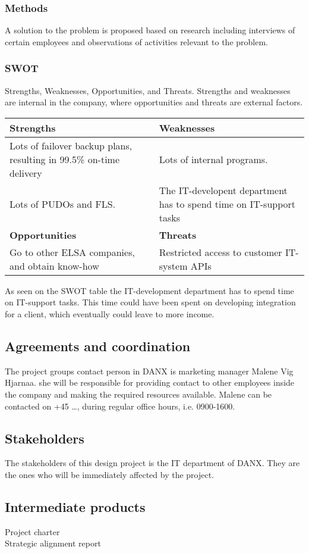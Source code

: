 \subsubsection{Methods}
A solution to the problem is proposed based on research including interviews of certain employees and observations of activities relevant to the problem.


\subsubsection{SWOT}
Strengths, Weaknesses, Opportunities, and Threats.
Strengths and weaknesses are internal in the company, where opportunities and threats are external factors.

\begin{table}[htdp]
\label{SWOT analysis}
\begin{tabular}{| p{} | p{} |}
\hline
\rowcolor{GR}
\textbf{Strengths} & \textbf{Weaknesses} \\ \hline \hline
Lots of failover backup plans, resulting in 99.5\% on-time delivery & Lots of internal programs.
\\ \hline
Lots of PUDOs and FLS. & The IT-developent department has to spend time on IT-support tasks \\ \hline \hline
\rowcolor{GR}
\textbf{Opportunities} & \textbf{Threats} \\ \hline
Go to other ELSA companies, and obtain know-how & Restricted access to customer IT-system APIs \\ \hline
\end{tabular}
\end{table}

As seen on the SWOT table the IT-development department has to spend time on IT-support tasks. This time could have been spent on developing integration for a client, which eventually could leave to more income.

\subsection{Agreements and coordination}
The project groups contact person in DANX is marketing manager Malene Vig Hjarnaa. she will be responsible for providing contact to other employees inside the company and making the required resources available. Malene can be contacted on +45 …, during regular office hours, i.e. 0900-1600.

\subsection{Stakeholders}
The stakeholders of this design project is the IT department of DANX. They are the ones who will be immediately affected by the project.

\subsection{Intermediate products}
\begin{description}
	\item[Project charter] 
	\item[Strategic alignment report] 
	\end{description}